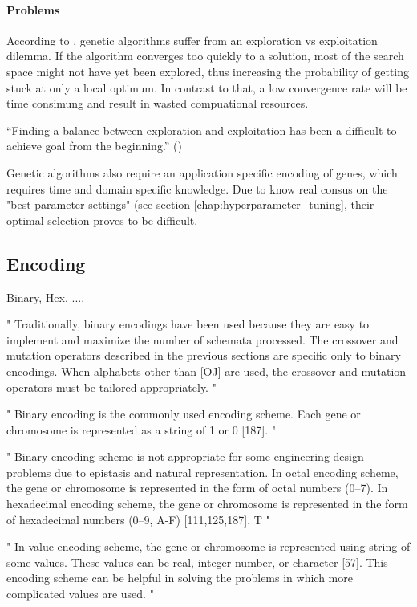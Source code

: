 \paragraph{Problems}
According to \cite{hussain_trade-off_2020}, genetic algorithms suffer from an exploration vs exploitation dilemma. If the algorithm converges too quickly to a solution, most of the search space might not have yet been explored, thus increasing the probability of getting stuck at only a local optimum.
In contrast to that, a low convergence rate will be time consimung and result in wasted compuational resources.

\enquote{Finding a balance between exploration and exploitation has been a difficult-to-achieve goal from the beginning.} (\cite{kacprzyk_parameter_2007})

Genetic algorithms also require an application specific encoding of genes, which requires time and domain specific knowledge. Due to know real consus on the "best parameter settings" (see section \ref{chap:hyperparameter_tuning}, their optimal selection proves to be difficult.




\subsection{Encoding}
\label{chap:foundation:ga:encoding}
Binary, Hex, ....

"
Traditionally, binary encodings have been used because they are easy to implement and maximize the number of schemata processed. The crossover and mutation operators described in the previous sections are specific only to binary encodings. When alphabets other than [OJ] are used, the crossover and mutation operators must be tailored appropriately.
"\cite{srinivas_genetic_1994}

"
Binary encoding is the commonly used encoding scheme. Each gene or chromosome is represented as a string of 1 or 0 [187].
"\cite{katoch_review_2021}

"
Binary encoding scheme is not appropriate for some engineering design problems due to epistasis and natural representation. In octal encoding scheme, the gene or chromosome is represented in the form of octal numbers (0–7). In hexadecimal encoding scheme, the gene or chromosome is represented in the form of hexadecimal numbers (0–9, A-F) [111,125,187]. T
"\cite{katoch_review_2021}

"
In value encoding scheme, the gene or chromosome is represented using string of some values. These values can be real, integer number, or character [57]. This encoding scheme can be helpful in solving the problems in which more complicated values are used.
"\cite{katoch_review_2021}

